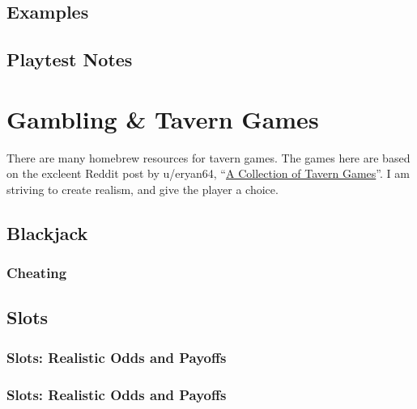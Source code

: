 \documentclass[twocolumn]{dndbook}
\begin{document}

\subsection{Examples}

\subsection{Playtest Notes}




\section{Gambling \& Tavern Games}

There are many homebrew resources for tavern games.
The games here are based on the excleent Reddit post by u/eryan64, ``\href{https://www.reddit.com/r/DnDBehindTheScreen/comments/fn6tng/a_collection_of_tavern_games/}{A Collection of Tavern Games}''.
I am striving to create realism, and give the player a choice.

\subsection{Blackjack}

\subsubsection{Cheating}
\subsection{Slots}

\subsubsection{Slots: Realistic Odds and Payoffs}

\subsubsection{Slots: Realistic Odds and Payoffs}
\end{document}
